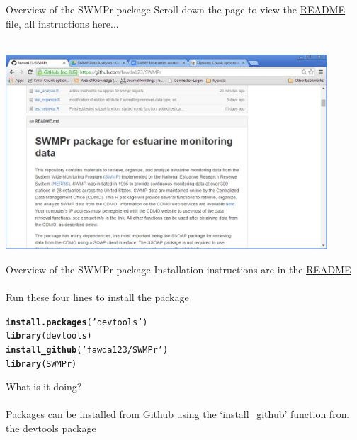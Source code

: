 \documentclass[xcolor=svgnames]{beamer}\usepackage[]{graphicx}\usepackage[]{color}
\makeatletter
\newcommand{\hlstr}[1]{\textcolor[rgb]{0.192,0.494,0.8}{#1}}%
\newcommand{\hlstd}[1]{\textcolor[rgb]{0.345,0.345,0.345}{#1}}%
\newcommand{\hlkwd}[1]{\textcolor[rgb]{0.737,0.353,0.396}{\textbf{#1}}}%
\newenvironment{kframe}{%
 \def\at@end@of@kframe{}%
 \ifinner\ifhmode%
  \def\at@end@of@kframe{\end{minipage}}%
  \begin{minipage}{\columnwidth}%
 \fi\fi%
 \def\FrameCommand##1{\hskip\@totalleftmargin \hskip-\fboxsep
 \colorbox{shadecolor}{##1}\hskip-\fboxsep
     \hskip-\linewidth \hskip-\@totalleftmargin \hskip\columnwidth}%
 \MakeFramed {\advance\hsize-\width
   \@totalleftmargin\z@ \linewidth\hsize
   \@setminipage}}%
 {\par\unskip\endMakeFramed%
 \at@end@of@kframe}
\newenvironment{knitrout}{}{} %
\makeatother
\begin{document}
\begin{frame}{Overview of the SWMPr package}
Scroll down the page to view the \href{https://github.com/fawda123/SWMPr/blob/master/README.md}{README} file, all instructions here...\\~\\
\centerline{\includegraphics[width = 0.9\textwidth]{swmpr_readme.png}}
\end{frame}

\begin{frame}[t, fragile]{Overview of the SWMPr package}
Installation instructions are in the \href{https://github.com/fawda123/SWMPr/blob/master/README.md}{README} \\~\\
Run these four lines to install the package
\begin{knitrout}
\color{fgcolor}\begin{kframe}
\begin{alltt}
\hlkwd{install.packages}\hlstd{(}\hlstr{'devtools'}\hlstd{)}
\hlkwd{library}\hlstd{(devtools)}
\hlkwd{install_github}\hlstd{(}\hlstr{'fawda123/SWMPr'}\hlstd{)}
\hlkwd{library}\hlstd{(SWMPr)}
\end{alltt}
\end{kframe}
\end{knitrout}
What is it doing? \\~\\
Packages can be installed from Github using the `install_github' function from the devtools package
\end{frame}
\end{document}
